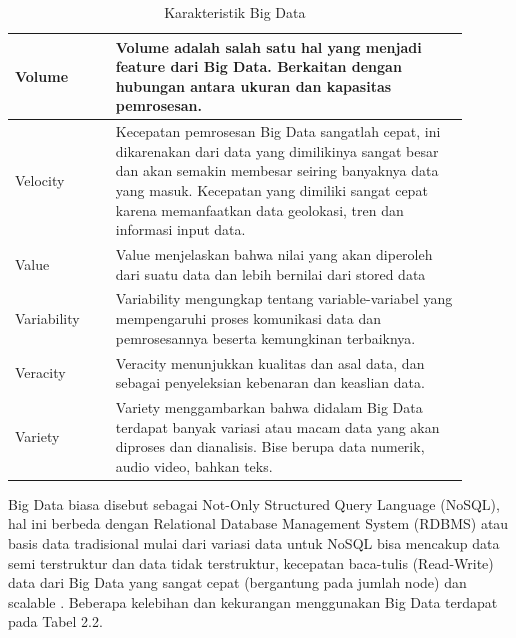 \documentclass[12pt,a4paper]{report}
\begin{document}
	\begin{table}[h]
		\centering
		\caption{Karakteristik Big Data \cite{Moura2015}\cite{Schaafsma2020}}
		\label{tab:my_label}
		\begin{tabular}{|p{0.2\linewidth} | p{0.7\linewidth}|} 
			\hline
			Volume\centering & Volume adalah salah satu hal yang menjadi feature dari Big Data. Berkaitan dengan hubungan antara ukuran dan kapasitas pemrosesan. \\ \hline
			Velocity\centering & Kecepatan pemrosesan Big Data sangatlah cepat, ini dikarenakan dari data yang dimilikinya sangat besar dan akan semakin membesar seiring banyaknya data yang masuk. Kecepatan yang dimiliki sangat cepat karena memanfaatkan data geolokasi, tren dan informasi input data. \\ \hline
			Value\centering & Value menjelaskan bahwa nilai yang akan diperoleh dari suatu data dan lebih bernilai dari stored data \\ \hline
			Variability\centering & Variability mengungkap tentang variable-variabel yang mempengaruhi proses komunikasi data dan pemrosesannya beserta kemungkinan terbaiknya. \\ \hline
			Veracity\centering & Veracity menunjukkan kualitas dan asal data, dan sebagai penyeleksian kebenaran dan keaslian data. \\ \hline
			Variety\centering & Variety menggambarkan bahwa didalam Big Data terdapat banyak variasi atau macam data yang akan diproses dan dianalisis. Bise berupa data numerik, audio video, bahkan teks. \\ \hline
		\end{tabular}
	\end{table}

	Big Data biasa disebut sebagai Not-Only Structured Query Language (NoSQL), hal ini berbeda dengan Relational Database Management System (RDBMS) atau basis data tradisional mulai dari variasi data untuk NoSQL bisa mencakup data semi terstruktur dan data tidak terstruktur, kecepatan baca-tulis (Read-Write) data dari Big Data yang sangat cepat (bergantung pada jumlah node) dan scalable \cite{Fadillah2020}. Beberapa kelebihan dan kekurangan menggunakan Big Data terdapat pada Tabel 2.2.
	
\end{document}

